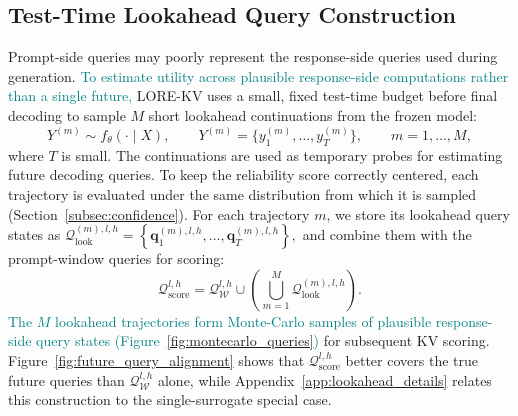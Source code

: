 \documentclass{article} %
\begin{document}
\subsection{Test-Time Lookahead Query Construction} \label{subsec:lookahead}
Prompt-side queries may poorly represent the response-side queries used during generation. \textcolor{teal}{To estimate utility across plausible response-side computations rather than a single future,} LORE-KV uses a small, fixed test-time budget before final decoding to sample $M$ short lookahead continuations from the frozen model:
\begin{equation}
Y^{(m)}\sim f_\theta(\cdot\mid X),\qquad
Y^{(m)}=\{y^{(m)}_1,\ldots,y^{(m)}_T\},\qquad
m=1,\ldots,M,
\label{eq:lookahead_cont}
\end{equation}
where $T$ is small. The continuations are used as temporary probes for estimating future decoding queries. To keep the reliability score correctly centered, each trajectory is evaluated under the same distribution from which it is sampled (Section~\ref{subsec:confidence}). For each trajectory $m$, we store its lookahead query states as $ \mathcal{Q}^{(m),l,h}_{\mathrm{look}} = \left\{ \mathbf{q}^{(m),l,h}_{1}, \ldots, \mathbf{q}^{(m),l,h}_{T} \right\}, $ and combine them with the prompt-window queries for scoring:
\begin{equation}
\mathcal{Q}^{l,h}_{\mathrm{score}}
=
\mathcal{Q}^{l,h}_{\mathcal{W}}
\cup
\left(
\bigcup_{m=1}^{M}
\mathcal{Q}^{(m),l,h}_{\mathrm{look}}
\right).
\label{eq:score_queries}
\end{equation}
\textcolor{teal}{The $M$ lookahead trajectories form Monte-Carlo samples of plausible response-side query states (Figure~\ref{fig:montecarlo_queries})} for subsequent KV scoring. Figure~\ref{fig:future_query_alignment} shows that $\mathcal{Q}^{l,h}_{\mathrm{score}}$ better covers the true future queries than $\mathcal{Q}^{l,h}_{\mathcal{W}}$ alone, while Appendix~\ref{app:lookahead_details} relates this construction to the single-surrogate special case.
\end{document}
